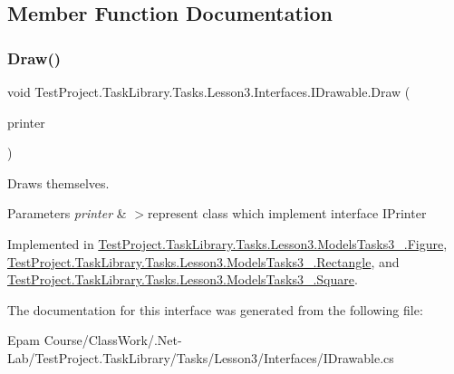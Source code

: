 \subsection{Member Function Documentation}
\mbox{\label{interface_test_project_1_1_task_library_1_1_tasks_1_1_lesson3_1_1_interfaces_1_1_i_drawable_a42d4b370fc36d2f695e312d7780c05d6}} 
\subsubsection{\texorpdfstring{Draw()}{Draw()}}
{\footnotesize\ttfamily void Test\+Project.\+Task\+Library.\+Tasks.\+Lesson3.\+Interfaces.\+I\+Drawable.\+Draw (\begin{DoxyParamCaption}\item[{I\+Printer}]{printer }\end{DoxyParamCaption})}



Draws themselves. 


\begin{DoxyParams}{Parameters}
{\em printer} & $>$represent class which implement interface I\+Printer\\
\hline
\end{DoxyParams}


Implemented in \mbox{\hyperlink{class_test_project_1_1_task_library_1_1_tasks_1_1_lesson3_1_1_models_tasks3__4_1_1_figure_a27545f8077537a70f0ac982adb5e95c8}{Test\+Project.\+Task\+Library.\+Tasks.\+Lesson3.\+Models\+Tasks3\+\_.\+Figure}}, \mbox{\hyperlink{class_test_project_1_1_task_library_1_1_tasks_1_1_lesson3_1_1_models_tasks3__4_1_1_rectangle_a907edce9a5bc56a45b69cae79d9d5322}{Test\+Project.\+Task\+Library.\+Tasks.\+Lesson3.\+Models\+Tasks3\+\_.\+Rectangle}}, and \mbox{\hyperlink{class_test_project_1_1_task_library_1_1_tasks_1_1_lesson3_1_1_models_tasks3__4_1_1_square_a564aa1273ffb7fa43c6e5774c4702716}{Test\+Project.\+Task\+Library.\+Tasks.\+Lesson3.\+Models\+Tasks3\+\_.\+Square}}.



The documentation for this interface was generated from the following file\+:\begin{DoxyCompactItemize}
\item 
Epam Course/\+Class\+Work/.\+Net-\/\+Lab/\+Test\+Project.\+Task\+Library/\+Tasks/\+Lesson3/\+Interfaces/I\+Drawable.\+cs\end{DoxyCompactItemize}
